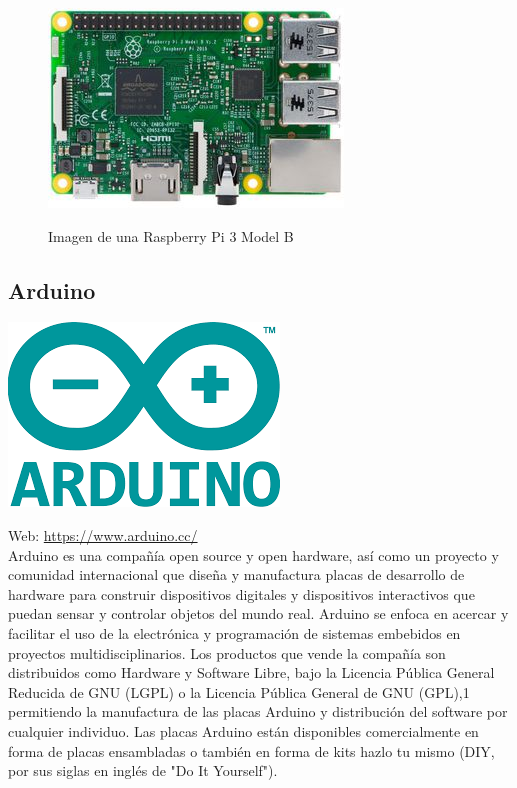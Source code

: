 \begin{figure}[H]
  \begin{center}
    \includegraphics[scale=0.6]{imagenes/raspberry-pi.jpg}\\
    \caption{Imagen de una Raspberry Pi 3 Model B}
  \end{center}
\end{figure}


\subsection{ Arduino }

\begin{center}
\includegraphics[scale=0.6]{imagenes/arduino_logo.png}
\end{center}

Web: \url{https://www.arduino.cc/}\\

Arduino es una compañía open source y open hardware, así como un proyecto y comunidad internacional que diseña y manufactura placas de desarrollo de hardware para construir
dispositivos digitales y dispositivos interactivos que puedan sensar y controlar objetos del mundo real. Arduino se enfoca en acercar y facilitar el uso de la electrónica y 
programación de sistemas embebidos en proyectos multidisciplinarios. Los productos que vende la compañía son distribuidos como Hardware y Software Libre, bajo la Licencia Pública 
General Reducida de GNU (LGPL) o la Licencia Pública General de GNU (GPL),1​permitiendo la manufactura de las placas Arduino y distribución del software por cualquier individuo.
Las placas Arduino están disponibles comercialmente en forma de placas ensambladas o también en forma de kits hazlo tu mismo (DIY, por sus siglas en inglés de "Do It Yourself").\\

